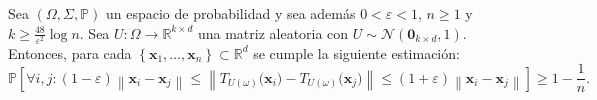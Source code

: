 \begin{theorem}\label{thm:johnson-lindenstrauss}
	Sea $\left(\Omega,\Sigma,\mathbb{P}\right)$ un espacio de
	probabilidad y sea además $0<\varepsilon<1$, $n\geq 1$ y
	$k\geq\frac{48}{\varepsilon^2}\log n$.
	Sea $U\colon\Omega\to\mathbb{R}^{k\times d}$ una matriz aleatoria
	con $U\sim\mathcal{N}\left(\symbf{0}_{k\times d},1\right)$.
	Entonces, para cada
	$\left\{\symbf{x}_{1},\dotsc,\symbf{x}_{n}\right\}\subset\mathbb{R}^{d}$
	se cumple la siguiente estimación:
	\begin{equation*}
		\mathbb{P}
		\left[
			\forall i,j:
			\left(1-\varepsilon\right)
			\left\|
			\symbf{x}_{i}-
			\symbf{x}_{j}
			\right\|\leq
			\left\|
			T_{U\left(\omega\right)}\big(\symbf{x}_{i}\big)-
			T_{U\left(\omega\right)}\big(\symbf{x}_{j}\big)
			\right\|\leq
			\left(1+\varepsilon\right)
			\left\|
			\symbf{x}_{i}-
			\symbf{x}_{j}
			\right\|
			\right]\geq
		1-\frac{1}{n}.
	\end{equation*}
\end{theorem}


